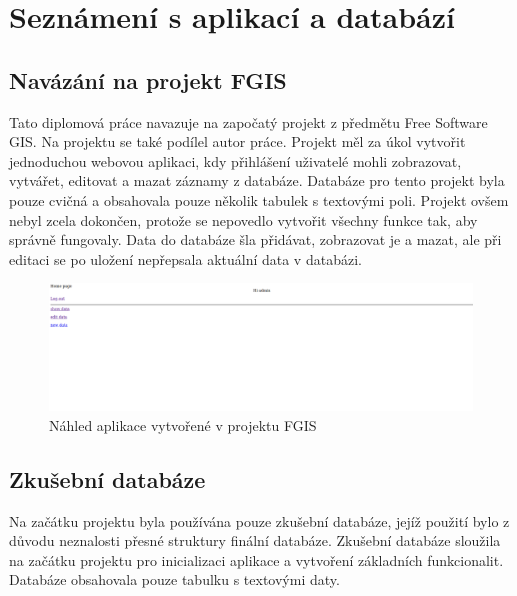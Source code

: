\chapter{Seznámení s aplikací a databází}
\label{3-seznameni-s-aplikaci-a-databazi}

\section{Navázání na projekt FGIS}

Tato diplomová práce navazuje na započatý projekt z předmětu Free
Software GIS. Na projektu se také podílel autor práce. 
Projekt měl za úkol vytvořit jednoduchou webovou aplikaci, kdy
přihlášení uživatelé mohli zobrazovat, vytvářet, editovat a mazat záznamy
z databáze. Databáze pro tento projekt byla pouze cvičná a obsahovala
pouze několik tabulek s textovými poli. Projekt ovšem nebyl zcela
dokončen, protože se nepovedlo vytvořit všechny funkce tak, aby
správně fungovaly. Data do databáze šla přidávat, zobrazovat je a 
mazat, ale při editaci se po uložení nepřepsala aktuální data v
databázi.

\begin{figure}[H] \centering
    \includegraphics[width=400pt]{./pictures/4-nahled-menu-fgis.PNG}
    \caption[Náhled aplikace vytvořené v projektu FGIS]{Náhled aplikace vytvořené v projektu FGIS}
	\label{fig:Náhled aplikace}              
\end{figure}
 
 \section{Zkušební databáze}
 
Na začátku projektu byla používána pouze zkušební databáze, jejíž použití 
bylo z důvodu neznalosti přesné struktury finální databáze. Zkušební databáze 
sloužila na začátku projektu pro inicializaci aplikace a vytvoření základních 
funkcionalit. Databáze obsahovala pouze tabulku s textovými daty.

 \newpage

